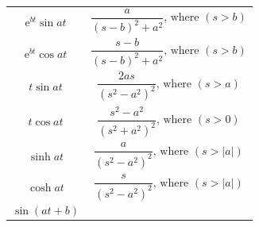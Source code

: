 \documentclass[
]{book}
\begin{document}
\begin{longtable}[]{@{}ll@{}}
\begin{minipage}[t]{0.42\columnwidth}
\[\mathrm{e}^{bt} \sin{at}\]\strut
\end{minipage} & \begin{minipage}[t]{0.52\columnwidth}\raggedright
\[\frac{a}{\left(s - b \right)^2 + a^2} \text{, where } \left(s\gt b \right) \]\strut
\end{minipage}\tabularnewline
\begin{minipage}[t]{0.42\columnwidth}\raggedright
\[\mathrm{e}^{bt} \cos{at}\]\strut
\end{minipage} & \begin{minipage}[t]{0.52\columnwidth}\raggedright
\[\frac{s-b}{\left(s - b \right)^2 + a^2} \text{, where } \left(s\gt b \right) \]\strut
\end{minipage}\tabularnewline
\begin{minipage}[t]{0.42\columnwidth}\raggedright
\[t \sin{at}\]\strut
\end{minipage} & \begin{minipage}[t]{0.52\columnwidth}\raggedright
\[\frac{2as}{\left(s^2  - a^2\right)^2} \text{, where } \left(s\gt a \right) \]\strut
\end{minipage}\tabularnewline
\begin{minipage}[t]{0.42\columnwidth}\raggedright
\[t \cos{at}\]\strut
\end{minipage} & \begin{minipage}[t]{0.52\columnwidth}\raggedright
\[\frac{s^2  - a^2}{\left(s^2  + a^2\right)^2} \text{, where } \left(s\gt 0 \right) \]\strut
\end{minipage}\tabularnewline
\begin{minipage}[t]{0.42\columnwidth}\raggedright
\[\sinh{at}\]\strut
\end{minipage} & \begin{minipage}[t]{0.52\columnwidth}\raggedright
\[\frac{a}{\left(s^2  - a^2\right)^2} \text{, where } \left(s\gt \lvert a \rvert \right) \]\strut
\end{minipage}\tabularnewline
\begin{minipage}[t]{0.42\columnwidth}\raggedright
\[\cosh{at}\]\strut
\end{minipage} & \begin{minipage}[t]{0.52\columnwidth}\raggedright
\[\frac{s}{\left(s^2  - a^2\right)^2} \text{, where } \left(s\gt \lvert a \rvert \right) \]\strut
\end{minipage}\tabularnewline
\begin{minipage}[t]{0.42\columnwidth}\raggedright
\[\sin \left(at + b\right)\]\strut
\end{minipage} & \begin{minipage}[t]{0.52\columnwidth}\raggedright

\end{minipage}
\end{longtable}
\end{document}
